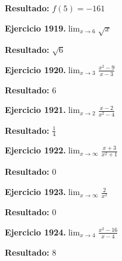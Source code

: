 \documentclass[10pt,a4paper]{article}
\begin{document}
\begin{solbox}
\textbf{Resultado:} \(\displaystyle f(5) = -161\)
\end{solbox}

\begin{ejbox}
\textbf{Ejercicio 1919.}\quad $\lim_{x\to 6} \sqrt{x}$
\end{ejbox}

\begin{solbox}
\textbf{Resultado:} \(\displaystyle \sqrt{6}\)
\end{solbox}

\begin{ejbox}
\textbf{Ejercicio 1920.}\quad $\lim_{x\to 3} \frac{x^2-9}{x-3}$
\end{ejbox}

\begin{solbox}
\textbf{Resultado:} \(\displaystyle 6\)
\end{solbox}

\newpage
\begin{ejbox}
\textbf{Ejercicio 1921.}\quad $\lim_{x\to 2} \frac{x-2}{x^2-4}$
\end{ejbox}

\begin{solbox}
\textbf{Resultado:} \(\displaystyle \frac{1}{4}\)
\end{solbox}

\begin{ejbox}
\textbf{Ejercicio 1922.}\quad $\lim_{x\to \infty} \frac{x + 3}{x^2 + 1}$
\end{ejbox}

\begin{solbox}
\textbf{Resultado:} \(\displaystyle 0\)
\end{solbox}

\begin{ejbox}
\textbf{Ejercicio 1923.}\quad $\lim_{x\to \infty} \frac{2}{x^2}$
\end{ejbox}

\begin{solbox}
\textbf{Resultado:} \(\displaystyle 0\)
\end{solbox}

\newpage
\begin{ejbox}
\textbf{Ejercicio 1924.}\quad $\lim_{x\to 4} \frac{x^2-16}{x-4}$
\end{ejbox}

\begin{solbox}
\textbf{Resultado:} \(\displaystyle 8\)
\end{solbox}
\end{document}
